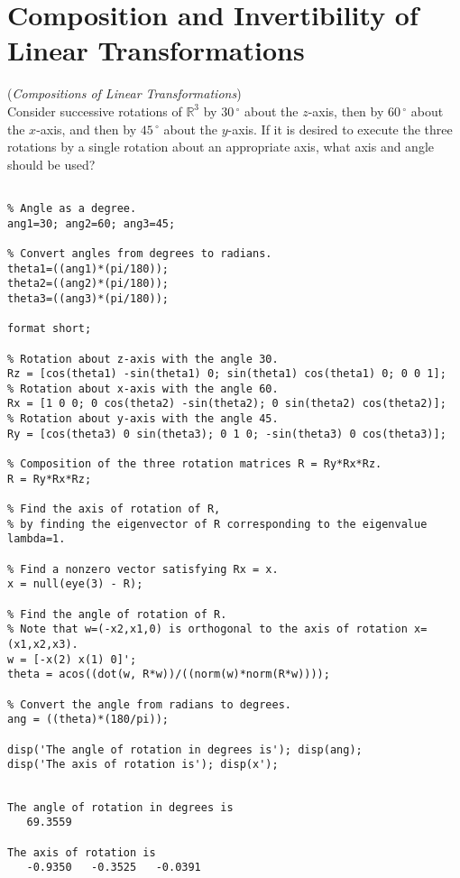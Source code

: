 \section{Composition and Invertibility of Linear Transformations}



\begin{exer}(\textit{Compositions of Linear Transformations})\\
Consider successive rotations of $\mathbb{R}^{3}$ by $30\,^{\circ}$ about the $z$-axis, then by $60\,^{\circ}$ about the $x$-axis, and then by $45\,^{\circ}$ about the $y$-axis. If it is desired to execute the three rotations by a single rotation about an appropriate axis, what axis and angle should be used?

\end{exer}


\begin{sol}
\begin{verbatim}

% Angle as a degree.
ang1=30; ang2=60; ang3=45; 

% Convert angles from degrees to radians.
theta1=((ang1)*(pi/180)); 
theta2=((ang2)*(pi/180));
theta3=((ang3)*(pi/180)); 

format short;

% Rotation about z-axis with the angle 30.
Rz = [cos(theta1) -sin(theta1) 0; sin(theta1) cos(theta1) 0; 0 0 1];
% Rotation about x-axis with the angle 60.
Rx = [1 0 0; 0 cos(theta2) -sin(theta2); 0 sin(theta2) cos(theta2)];
% Rotation about y-axis with the angle 45.
Ry = [cos(theta3) 0 sin(theta3); 0 1 0; -sin(theta3) 0 cos(theta3)];

% Composition of the three rotation matrices R = Ry*Rx*Rz.
R = Ry*Rx*Rz; 

% Find the axis of rotation of R,
% by finding the eigenvector of R corresponding to the eigenvalue lambda=1.

% Find a nonzero vector satisfying Rx = x.
x = null(eye(3) - R); 

% Find the angle of rotation of R.
% Note that w=(-x2,x1,0) is orthogonal to the axis of rotation x=(x1,x2,x3).
w = [-x(2) x(1) 0]';
theta = acos((dot(w, R*w))/((norm(w)*norm(R*w))));

% Convert the angle from radians to degrees.
ang = ((theta)*(180/pi));

disp('The angle of rotation in degrees is'); disp(ang);
disp('The axis of rotation is'); disp(x');
\end{verbatim}


\begin{outputs}

\begin{verbatim}

The angle of rotation in degrees is
   69.3559

The axis of rotation is
   -0.9350   -0.3525   -0.0391
\end{verbatim}

\end{outputs}
\end{sol}